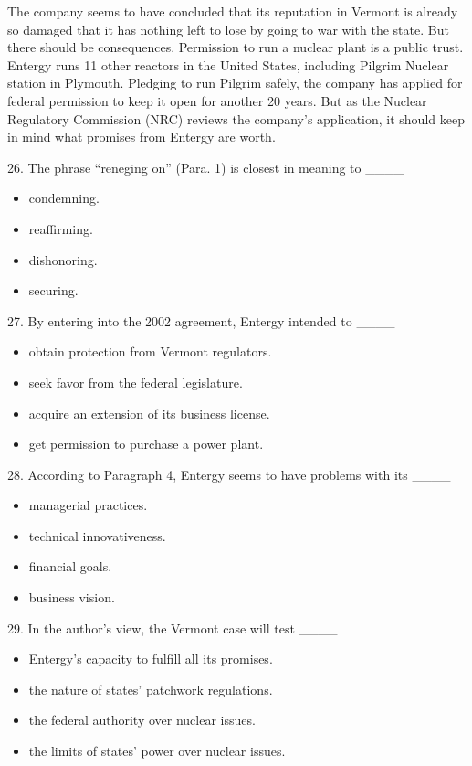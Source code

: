 \documentclass[UTF8,11pt]{ctexart}
\begin{document}
The company seems to have concluded that its reputation in Vermont is already so damaged that it has nothing left to lose by going to war with the state. But there should be consequences. Permission to run a nuclear plant is a public trust. Entergy runs 11 other reactors in the United States, including Pilgrim Nuclear station in Plymouth. Pledging to run Pilgrim safely, the company has applied for federal permission to keep it open for another 20 years. But as the Nuclear Regulatory Commission (NRC) reviews the company’s application, it should keep in mind what promises from Entergy are worth.


26. The phrase “reneging on” (Para. 1) is closest in meaning to \_\_\_\_


\begin{itemize}[leftmargin=2em,itemsep=.2em,topsep=.4em]\item[A.] condemning.
\item[B.] reaffirming.
\item[C.] dishonoring.
\item[D.] securing.
\end{itemize}

27. By entering into the 2002 agreement, Entergy intended to \_\_\_\_


\begin{itemize}[leftmargin=2em,itemsep=.2em,topsep=.4em]\item[A.] obtain protection from Vermont regulators.
\item[B.] seek favor from the federal legislature.
\item[C.] acquire an extension of its business license.
\item[D.] get permission to purchase a power plant.
\end{itemize}

28. According to Paragraph 4, Entergy seems to have problems with its \_\_\_\_


\begin{itemize}[leftmargin=2em,itemsep=.2em,topsep=.4em]\item[A.] managerial practices.
\item[B.] technical innovativeness.
\item[C.] financial goals.
\item[D.] business vision.
\end{itemize}

29. In the author’s view, the Vermont case will test \_\_\_\_


\begin{itemize}[leftmargin=2em,itemsep=.2em,topsep=.4em]\item[A.] Entergy’s capacity to fulfill all its promises.
\item[B.] the nature of states’ patchwork regulations.
\item[C.] the federal authority over nuclear issues.
\item[D.] the limits of states’ power over nuclear issues.
\end{itemize}
\end{document}
